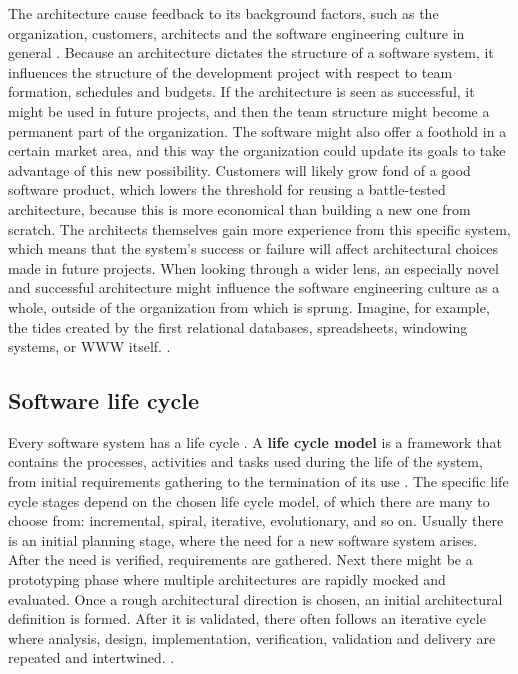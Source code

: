 \documentclass[utf8,english]{gradu3}
\begin{document}
The architecture cause feedback to its background factors, such as the
organization, customers, architects and the software engineering culture in
general \parencite{Bass1998}. Because an architecture dictates the structure of a software
system, it influences the structure of the development project with respect to
team formation, schedules and budgets. If the architecture is seen as
successful, it might be used in future projects, and then the team structure
might become a permanent part of the organization. The software might also offer
a foothold in a certain market area, and this way the organization could update
its goals to take advantage of this new possibility. Customers will likely grow
fond of a good software product, which lowers the threshold for reusing a
battle-tested architecture, because this is more economical than building a new
one from scratch. The architects themselves gain more experience from this
specific system, which means that the system's success or failure will affect
architectural choices made in future projects. When looking through a wider
lens, an especially novel and successful architecture might influence the
software engineering culture as a whole, outside of the organization from which
is sprung. Imagine, for example, the tides created by the first relational
databases, spreadsheets, windowing systems, or WWW itself. \parencite[10-11]{Bass1998}.


\subsection{Software life cycle}
Every software system has a life cycle \parencite[17]{IEEE12207}. A \textbf{life cycle model} is a
framework that contains the processes, activities and tasks used during the life
of the system, from initial requirements gathering to the termination of its use
\parencite[3]{IEEE42010}. The specific life cycle stages depend on the chosen life cycle
model, of which there are many to choose from: incremental, spiral, iterative,
evolutionary, and so on. Usually there is an initial planning stage, where the
need for a new software system arises. After the need is verified, requirements
are gathered. Next there might be a prototyping phase where multiple
architectures are rapidly mocked and evaluated. Once a rough architectural
direction is chosen, an initial architectural definition is formed. After it is
validated, there often follows an iterative cycle where analysis, design,
implementation, verification, validation and delivery are repeated and
intertwined. \parencite[18]{IEEE12207}.
\end{document}
